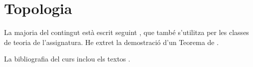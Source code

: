 \documentclass[../tercer.tex]{subfiles}
\begin{document}
\part{Topologia}




\printbibliography
La majoria del contingut està escrit seguint \cite{ACTEAguade}, que també s'utilitza per les classes de teoria de l'assignatura.
He extret la demostració d'un Teorema de \cite{SchultzFreeActionsOnFiniteGroupsOnHausdorffSpaces}.

La bibliografia del curs inclou els textos \cite{AFirstCourseInAlgebraicTopologyKosniowski,ABasicCourseInAlgebraicTopologyKosniowski,TopologyKlaus,ACTEAguade}.
\end{document}
